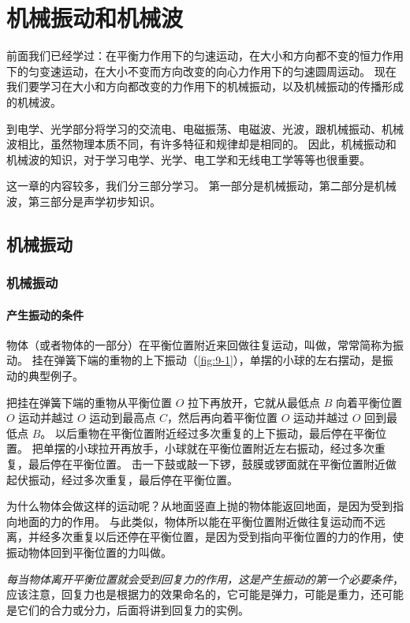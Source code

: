 \chapter{机械振动和机械波}
前面我们已经学过：在平衡力作用下的匀速运动，在大小和方向都不变的恒力作用下的匀变速运动，在大小不变而方向改变的向心力作用下的匀速圆周运动。
现在我们要学习在大小和方向都改变的力作用下的机械振动，以及机械振动的传播形成的机械波。

到电学、光学部分将学习的交流电、电磁振荡、电磁波、光波，跟机械振动、机械波相比，虽然物理本质不同，有许多特征和规律却是相同的。
因此，机械振动和机械波的知识，对于学习电学、光学、电工学和无线电工学等等也很重要。

这一章的内容较多，我们分三部分学习。
第一部分是机械振动，第二部分是机械波，第三部分是声学初步知识。

\section{机械振动}
\subsection{机械振动}
\subsubsection{产生振动的条件} 
物体（或者物体的一部分）在平衡位置附近来回做往复运动，叫做，常常简称为振动。
挂在弹簧下端的重物的上下振动（\cref{fig:9-1}），单摆的小球的左右摆动，是振动的典型例子。

把挂在弹簧下端的重物从平衡位置 $O$ 拉下再放开，它就从最低点 $B$ 向着平衡位置 $O$ 运动并越过 $O$ 运动到最高点 $C$，然后再向着平衡位置 $O$ 运动并越过 $O$ 回到最低点 $B$。
以后重物在平衡位置附近经过多次重复的上下振动，最后停在平衡位置。
把单摆的小球拉开再放手，小球就在平衡位置附近左右振动，经过多次重复，最后停在平衡位置。
击一下鼓或敲一下锣，鼓膜或锣面就在平衡位置附近做起伏振动，经过多次重复，最后停在平衡位置。

为什么物体会做这样的运动呢？从地面竖直上抛的物体能返回地面，是因为受到指向地面的力的作用。
与此类似，物体所以能在平衡位置附近做往复运动而不远离，并经多次重复以后还停在平衡位置，是因为受到指向平衡位置的力的作用，使振动物体回到平衡位置的力叫做。

\emph{每当物体离开平衡位置就会受到回复力的作用，这是产生振动的第一个必要条件}，应该注意，回复力也是根据力的效果命名的，它可能是弹力，可能是重力，还可能是它们的合力或分力，后面将讲到回复力的实例。 

